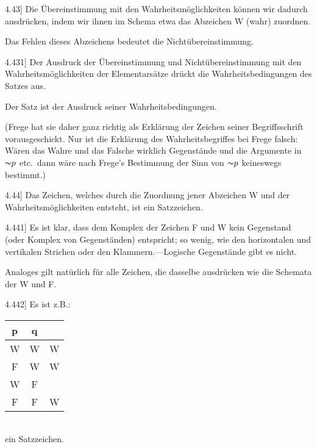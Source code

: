 \documentclass[12pt,oneside]{book}[2007/10/19]
\newcommand{\PropERef}[1]{\hyperref[PropE:#1]{#1}}
\newcommand{\PropositionG}[2]{%
  \item[\phantomsection\label{PropG:#1}\PropERef{#1}] #2%
}
\newcommand{\Not}[1]{\mathord{\thicksim} #1}
\newcommand{\zumBeispiel}{z.\;B.}
\newcommand{\Strut}[1][12pt]{\rule{0pt}{#1}}
\begin{document}
\begin{propositions}
\PropositionG{4.43}
{Die Übereinstimmung mit den Wahrheitsmöglichkeiten
können wir dadurch ausdrücken, indem
wir ihnen im Schema etwa das Abzeichen \glqq{}W\grqq{}
(wahr) zuordnen.

Das Fehlen dieses Abzeichens bedeutet die
Nichtübereinstimmung.}


\PropositionG{4.431}
{Der Ausdruck der Übereinstimmung und Nichtübereinstimmung
mit den Wahrheitsmöglichkeiten
der Elementarsätze drückt die Wahrheitsbedingungen
des Satzes aus.

Der Satz ist der Ausdruck seiner Wahrheitsbedingungen.

(Frege hat sie daher ganz richtig als Erklärung
der Zeichen seiner Begriffsschrift vorausgeschickt.
Nur ist die Erklärung des Wahrheitsbegriffes bei
Frege falsch: Wären \glqq{}das Wahre\grqq{} und \glqq{}das Falsche\grqq{}
wirklich Gegenstände und die Argumente in $\Not{p}$
etc.\ dann wäre nach Frege's Bestimmung der Sinn
von \glqq{}$\Not{p}$\grqq{} keineswegs bestimmt.)}


\PropositionG{4.44}
{Das Zeichen, welches durch die Zuordnung
jener Abzeichen \glqq{}W\grqq{} und der Wahrheitsmöglichkeiten
entsteht, ist ein Satzzeichen.}


\PropositionG{4.441}
{Es ist klar, dass dem Komplex der Zeichen
\glqq{}F\grqq{} und \glqq{}W\grqq{} kein Gegenstand (oder Komplex von
Gegenständen) entspricht; so wenig, wie den horizontalen
und vertikalen Strichen oder den Klammern.---\glqq{}Logische
Gegenstände\grqq{} gibt es nicht.

Analoges gilt natürlich für alle Zeichen, die dasselbe
ausdrücken wie die Schemata der \glqq{}W\grqq{} und \glqq{}F\grqq{}.}


\PropositionG{4.442}
{Es ist \zumBeispiel:\\
\phantom{Es ist \zumBeispiel:}
\raisebox{-2.3\baselineskip}{\glqq{}}\begin{tabular}{c|c|c}
p & q &\\
\hline
\hline
\Strut W & W & W\\
\hline
\Strut F & W & W\\
\hline
\Strut W & F &\\
\hline
\Strut F & F & W\\
\hline
\end{tabular}\\
\phantom{Es ist \zumBeispiel: \glqq{}\begin{tabular}{c|c|c}W&W&W\end{tabular}}
\smash[t]{\raisebox{5.8\baselineskip}{\grqq{}}} ein Satzzeichen.

}
\end{propositions}
\end{document}
